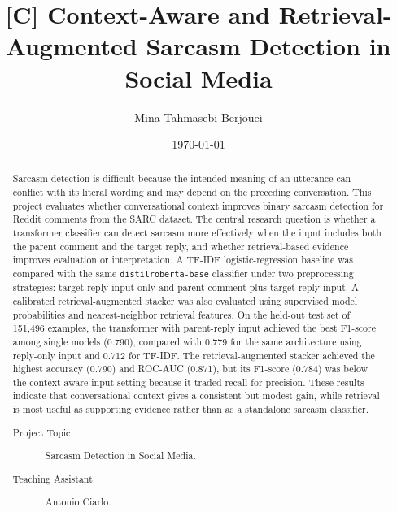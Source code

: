 \documentclass[%
 reprint,
 amsmath,amssymb,
 aps,
]{revtex4-2}
\begin{document}
\title{[C] Context-Aware and Retrieval-Augmented Sarcasm Detection in Social Media}%

\author{Mina Tahmasebi Berjouei}

\date{\today}%

\begin{abstract} %
Sarcasm detection is difficult because the intended meaning of an utterance can conflict with its literal wording and may depend on the preceding conversation. This project evaluates whether conversational context improves binary sarcasm detection for Reddit comments from the SARC dataset. The central research question is whether a transformer classifier can detect sarcasm more effectively when the input includes both the parent comment and the target reply, and whether retrieval-based evidence improves evaluation or interpretation. A TF-IDF logistic-regression baseline was compared with the same \texttt{distilroberta-base} classifier under two preprocessing strategies: target-reply input only and parent-comment plus target-reply input. A calibrated retrieval-augmented stacker was also evaluated using supervised model probabilities and nearest-neighbor retrieval features. On the held-out test set of 151,496 examples, the transformer with parent-reply input achieved the best F1-score among single models (0.790), compared with 0.779 for the same architecture using reply-only input and 0.712 for TF-IDF. The retrieval-augmented stacker achieved the highest accuracy (0.790) and ROC-AUC (0.871), but its F1-score (0.784) was below the context-aware input setting because it traded recall for precision. These results indicate that conversational context gives a consistent but modest gain, while retrieval is most useful as supporting evidence rather than as a standalone sarcasm classifier.

\begin{description} %
\item[Project Topic] %
{Sarcasm Detection in Social Media.}
\item[Teaching Assistant] %
{Antonio Ciarlo.}
\end{description} %
\end{abstract}

\maketitle
\end{document}
